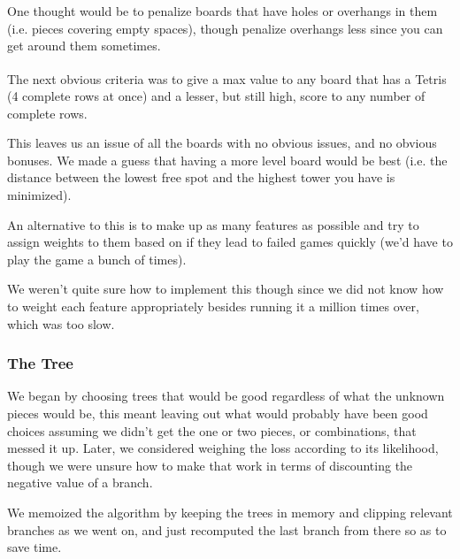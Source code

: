\documentclass[fontsize=12pt]{article}
\def\tetris{Tetris\textsuperscript{\textregistered}}
\begin{document}
\par One thought would be to penalize boards that have holes or overhangs in them (i.e. pieces covering empty spaces), though penalize overhangs less since you can get around them sometimes.

\par The next obvious criteria was to give a max value to any board that has a \tetris{} (4 complete rows at once) and a lesser, but still high, score to any number of complete rows.

\par This leaves us an issue of all the boards with no obvious issues, and no obvious bonuses. We made a guess that having a more level board would be best (i.e. the distance between the lowest free spot and the highest tower you have is minimized).

\par An alternative to this is to make up as many features as possible and try to assign weights to them based on if they lead to failed games quickly (we'd have to play the game a bunch of times).

\par We weren't quite sure how to implement this though since we did not know how to weight each feature appropriately besides running it a million times over, which was too slow.

\subsubsection{The Tree}

\par We began by choosing trees that would be good regardless of what the unknown pieces would be, this meant leaving out what would probably have been good choices assuming we didn't get the one or two pieces, or combinations, that messed it up. Later, we considered weighing the loss according to its likelihood, though we were unsure how to make that work in terms of discounting the negative value of a branch.

\par We memoized the algorithm by keeping the trees in memory and clipping relevant branches as we went on, and just recomputed the last branch from there so as to save time.

\end{document}
